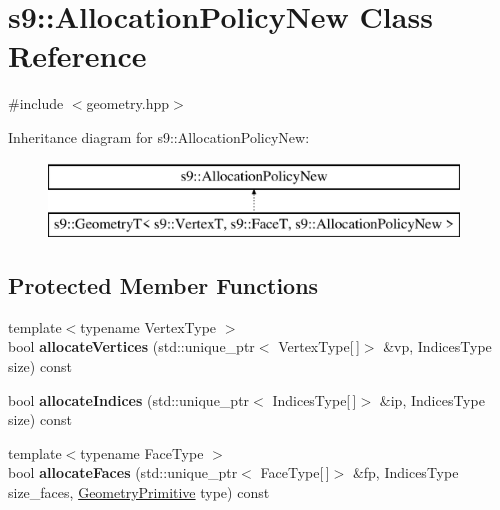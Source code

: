 \hypertarget{classs9_1_1AllocationPolicyNew}{\section{s9\-:\-:Allocation\-Policy\-New Class Reference}
\label{classs9_1_1AllocationPolicyNew}
}


{\ttfamily \#include $<$geometry.\-hpp$>$}

Inheritance diagram for s9\-:\-:Allocation\-Policy\-New\-:\begin{figure}[H]
\begin{center}
\leavevmode
\includegraphics[height=2.000000cm]{classs9_1_1AllocationPolicyNew}
\end{center}
\end{figure}
\subsection*{Protected Member Functions}
\begin{DoxyCompactItemize}
\item 
\hypertarget{classs9_1_1AllocationPolicyNew_aaaa439b82aff0401c8e8e9e5e59b4a53}{{\footnotesize template$<$typename Vertex\-Type $>$ }\\bool {\bfseries allocate\-Vertices} (std\-::unique\-\_\-ptr$<$ Vertex\-Type\mbox{[}$\,$\mbox{]}$>$ \&vp, Indices\-Type size) const }\label{classs9_1_1AllocationPolicyNew_aaaa439b82aff0401c8e8e9e5e59b4a53}

\item 
\hypertarget{classs9_1_1AllocationPolicyNew_ac4f40e98e06df1689cf24c3a7de288d0}{bool {\bfseries allocate\-Indices} (std\-::unique\-\_\-ptr$<$ Indices\-Type\mbox{[}$\,$\mbox{]}$>$ \&ip, Indices\-Type size) const }\label{classs9_1_1AllocationPolicyNew_ac4f40e98e06df1689cf24c3a7de288d0}

\item 
\hypertarget{classs9_1_1AllocationPolicyNew_a3bc2deceba78201f4c0a17567f28cb1f}{{\footnotesize template$<$typename Face\-Type $>$ }\\bool {\bfseries allocate\-Faces} (std\-::unique\-\_\-ptr$<$ Face\-Type\mbox{[}$\,$\mbox{]}$>$ \&fp, Indices\-Type size\-\_\-faces, \hyperlink{namespaces9_ad57d1332f8fd67d23f6a1d3520ab785c}{Geometry\-Primitive} type) const }\label{classs9_1_1AllocationPolicyNew_a3bc2deceba78201f4c0a17567f28cb1f}

\end{DoxyCompactItemize}


